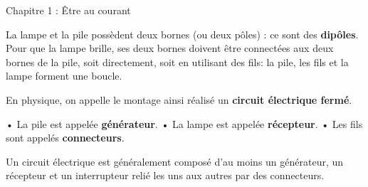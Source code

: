 \documentclass[24pt]{article}
\newcommand{\titre}{Chapitre 1 : Être au courant} %
\begin{document}
\thispagestyle{fancy}
\cfoot{}

\begin{titlebox}{\titre}
    \setlength\parindent{4pt} %
    \setlength\parskip{5pt} 

    La lampe et la pile possèdent deux bornes (ou deux pôles) : ce sont des \textbf{\color{DarkRed} {dipôles}}. Pour que la lampe brille, ses deux
    bornes doivent être connectées aux deux bornes de la pile, soit directement, soit en utilisant des fils: la pile, les fils et
    la lampe forment une boucle. 
    
    En physique, on appelle le montage ainsi réalisé un \textbf{\color{DarkRed} {circuit électrique fermé}}.

    • La pile est appelée \textbf{\color{DarkRed} {générateur}}.
    • La lampe est appelée \textbf{\color{DarkRed} {récepteur}}.
    • Les fils sont appelés \textbf{\color{DarkRed} {connecteurs}}.
    
    Un circuit électrique est généralement composé d’au moins un
    générateur, un récepteur et un interrupteur relié les uns
    aux autres par des connecteurs.
    
    \vspace{50pt}


    

\end{titlebox}
\end{document}
